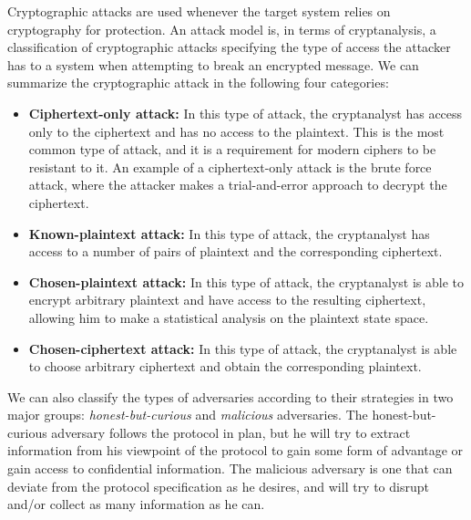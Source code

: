 Cryptographic attacks are used whenever the target system relies on cryptography for protection. An attack model is, in terms of cryptanalysis, a classification of cryptographic attacks specifying the type of access the attacker has to a system when attempting to break an encrypted message. We can summarize the cryptographic attack in the following four categories:

 \begin{itemize}

    \item \textbf{Ciphertext-only attack:} In this type of attack, the cryptanalyst has access only to the ciphertext and has no access to the plaintext. This is the most common type of attack, and it is a requirement for modern ciphers to be resistant to it. An example of a ciphertext-only attack is the brute force attack, where the attacker makes a trial-and-error approach to decrypt the ciphertext.

    \item \textbf{Known-plaintext attack:} In this type of attack, the cryptanalyst has access to a number of pairs of plaintext and the corresponding ciphertext.

    \item \textbf{Chosen-plaintext attack:} In this type of attack, the cryptanalyst is able to encrypt arbitrary plaintext and have access to the resulting ciphertext, allowing him to make a statistical analysis on the plaintext state space.

    \item \textbf{Chosen-ciphertext attack:} In this type of attack, the cryptanalyst is able to choose arbitrary ciphertext and obtain the corresponding plaintext.
\end{itemize}


We can also classify the types of adversaries according to their strategies in two major groups: \textit{honest-but-curious} and \textit{malicious} adversaries.
The honest-but-curious adversary follows the protocol in plan, but he will try to extract information from his viewpoint of the protocol to gain some form of advantage or gain access to confidential information.
The malicious adversary is one that can deviate from the protocol specification as he desires, and will try to disrupt and/or collect as many information as he can.

%

